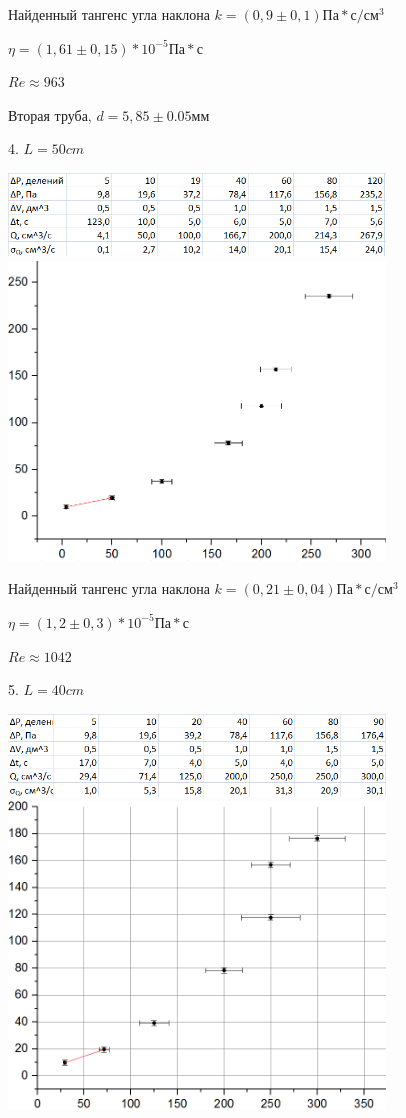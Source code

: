 \documentclass[12pt]{article}
\begin{document}
    Найденный тангенс угла наклона $k=(0,9 \pm 0,1) Па*с/см^3$
    
    $\eta = (1,61 \pm 0,15) * 10^{-5} Па*с$
    
    $Re \approx 963$
    
    Вторая труба, $d=5,85 \pm 0.05 мм$
    
    4. $L = 50cm$
    
    \begin{center}
    	\includegraphics[width=10cm]{table4.png}
    	\includegraphics[width=10cm]{graph4.png}
    \end{center}
    
    Найденный тангенс угла наклона $k=(0,21 \pm 0,04) Па*с/см^3$
    
    $\eta = (1,2 \pm 0,3) * 10^{-5} Па*с$
    
    $Re \approx 1042$
    
    5. $L = 40cm$
    
    \begin{center}
    	\includegraphics[width=10cm]{table5.png}
    	\includegraphics[width=10cm]{graph5.png}
    \end{center}
    
\end{document}
